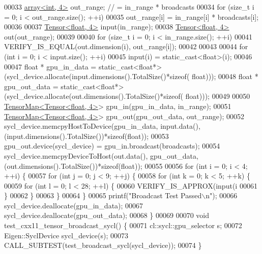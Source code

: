 \begin{DoxyCode}
00033   \hyperlink{class_eigen_1_1array}{array<int, 4>} out\_range;  \textcolor{comment}{// = in\_range * broadcasts}
00034   \textcolor{keywordflow}{for} (\textcolor{keywordtype}{size\_t} i = 0; i < out\_range.size(); ++i)
00035     out\_range[i] = in\_range[i] * broadcasts[i];
00036 
00037   \hyperlink{class_eigen_1_1_tensor}{Tensor<float, 4>}  input(in\_range);
00038   \hyperlink{class_eigen_1_1_tensor}{Tensor<float, 4>} out(out\_range);
00039 
00040   \textcolor{keywordflow}{for} (\textcolor{keywordtype}{size\_t} i = 0; i < in\_range.size(); ++i)
00041     VERIFY\_IS\_EQUAL(out.dimension(i), out\_range[i]);
00042 
00043 
00044   \textcolor{keywordflow}{for} (\textcolor{keywordtype}{int} i = 0; i < input.size(); ++i)
00045     input(i) = \textcolor{keyword}{static\_cast<}\textcolor{keywordtype}{float}\textcolor{keyword}{>}(i);
00046 
00047   \textcolor{keywordtype}{float} * gpu\_in\_data  = \textcolor{keyword}{static\_cast<}\textcolor{keywordtype}{float}*\textcolor{keyword}{>}(sycl\_device.allocate(input.dimensions().TotalSize()*\textcolor{keyword}{sizeof}(
      float)));
00048   \textcolor{keywordtype}{float} * gpu\_out\_data  = \textcolor{keyword}{static\_cast<}\textcolor{keywordtype}{float}*\textcolor{keyword}{>}(sycl\_device.allocate(out.dimensions().TotalSize()*\textcolor{keyword}{sizeof}(
      float)));
00049 
00050   \hyperlink{class_eigen_1_1_tensor_map}{TensorMap<Tensor<float, 4>}>  gpu\_in(gpu\_in\_data, in\_range);
00051   \hyperlink{class_eigen_1_1_tensor_map}{TensorMap<Tensor<float, 4>}> gpu\_out(gpu\_out\_data, out\_range);
00052   sycl\_device.memcpyHostToDevice(gpu\_in\_data, input.data(),(input.dimensions().TotalSize())*\textcolor{keyword}{sizeof}(\textcolor{keywordtype}{float}));
00053   gpu\_out.device(sycl\_device) = gpu\_in.broadcast(broadcasts);
00054   sycl\_device.memcpyDeviceToHost(out.data(), gpu\_out\_data,(out.dimensions().TotalSize())*\textcolor{keyword}{sizeof}(\textcolor{keywordtype}{float}));
00055 
00056   \textcolor{keywordflow}{for} (\textcolor{keywordtype}{int} i = 0; i < 4; ++i) \{
00057     \textcolor{keywordflow}{for} (\textcolor{keywordtype}{int} j = 0; j < 9; ++j) \{
00058       \textcolor{keywordflow}{for} (\textcolor{keywordtype}{int} k = 0; k < 5; ++k) \{
00059         \textcolor{keywordflow}{for} (\textcolor{keywordtype}{int} l = 0; l < 28; ++l) \{
00060           VERIFY\_IS\_APPROX(input(i%
00061         \}
00062       \}
00063     \}
00064   \}
00065   printf(\textcolor{stringliteral}{"Broadcast Test Passed\(\backslash\)n"});
00066   sycl\_device.deallocate(gpu\_in\_data);
00067   sycl\_device.deallocate(gpu\_out\_data);
00068 \}
00069 
00070 \textcolor{keywordtype}{void} test\_cxx11\_tensor\_broadcast\_sycl() \{
00071   cl::sycl::gpu\_selector s;
00072   Eigen::SyclDevice sycl\_device(s);
00073   CALL\_SUBTEST(test\_broadcast\_sycl(sycl\_device));
00074 \}
\end{DoxyCode}
